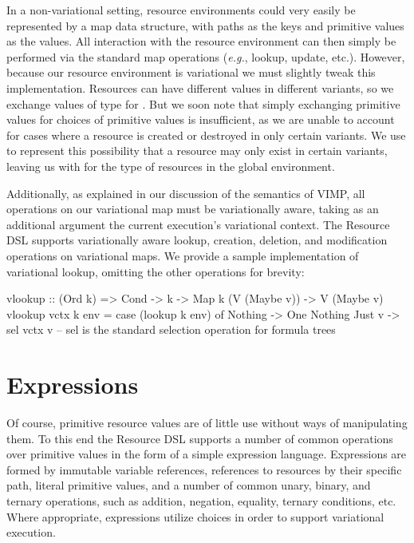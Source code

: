 \documentclass[onehalf,11pt]{beavtex}
\begin{document}
In a non-variational setting, resource environments could very easily be represented by a map data structure,
with paths as the keys and primitive values as the values. All interaction with the resource environment can then
simply be performed via the standard map operations (\emph{e.g.}, lookup, update, etc.). However, because our resource environment
is variational we must slightly tweak this implementation. Resources can have different values in different
variants, so we exchange values of type  for . But we soon note that simply exchanging primitive values
for choices of primitive values is insufficient, as we are unable to
account for cases where a resource is created or destroyed in only certain variants. We use  to represent this possibility
that a resource may only exist in certain variants, leaving us with  for the type of resources in the global environment.

Additionally, as explained in our discussion of the semantics of VIMP, all operations on our variational map must be variationally aware,
taking as an additional argument the current execution's variational context. The Resource DSL supports variationally aware lookup,
creation, deletion, and modification operations on variational maps. We provide a sample implementation of variational lookup, omitting
the other operations for brevity:

\begin{program}
vlookup :: (Ord k) => Cond -> k -> Map k (V (Maybe v)) -> V (Maybe v)
vlookup vctx k env = case (lookup k env) of
    Nothing -> One Nothing
    Just v -> sel vctx v  -- sel is the standard selection operation for formula trees
\end{program}

\section{Expressions}

Of course, primitive resource values are of little use without ways of manipulating them. To this end the Resource DSL supports
a number of common operations over primitive values in the form of a simple expression language. Expressions are formed by
immutable variable references, references to resources by their specific path, literal primitive values, and a number of common unary, binary, and ternary
operations, such as addition, negation, equality, ternary conditions, etc. Where appropriate, expressions utilize choices in order to support
variational execution.
\end{document}

